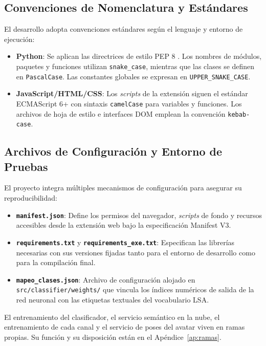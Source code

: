 \subsection{Convenciones de Nomenclatura y Estándares}

El desarrollo adopta convenciones estándares según el lenguaje y entorno de ejecución:

\begin{itemize}
    \item \textbf{Python}: Se aplican las directrices de estilo PEP 8 \cite{vanrossum2001pep8}. Los nombres de módulos, paquetes y funciones utilizan \texttt{snake\_case}, mientras que las clases se definen en \texttt{PascalCase}. Las constantes globales se expresan en \texttt{UPPER\_SNAKE\_CASE}.
    \item \textbf{JavaScript/HTML/CSS}: Los \textit{scripts} de la extensión siguen el estándar ECMAScript 6+ \cite{ecma2015ecmascript} con sintaxis \texttt{camelCase} para variables y funciones. Los archivos de hoja de estilo e interfaces DOM emplean la convención \texttt{kebab-case}.
\end{itemize}

\subsection{Archivos de Configuración y Entorno de Pruebas}

El proyecto integra múltiples mecanismos de configuración para asegurar su reproducibilidad:

\begin{itemize}
    \item \textbf{\texttt{manifest.json}}: Define los permisos del navegador, \textit{scripts} de fondo y recursos accesibles desde la extensión web bajo la especificación Manifest V3.
    \item \textbf{\texttt{requirements.txt}} y \textbf{\texttt{requirements\_exe.txt}}: Especifican las librerías necesarias con sus versiones fijadas tanto para el entorno de desarrollo como para la compilación final.
    \item \textbf{\texttt{mapeo\_clases.json}}: Archivo de configuración alojado en \texttt{src/\allowbreak classifier/\allowbreak weights/} que vincula los índices numéricos de salida de la red neuronal con las etiquetas textuales del vocabulario LSA.
\end{itemize}

El entrenamiento del clasificador, el servicio semántico en la nube, el entrenamiento de cada canal y el servicio de poses del avatar viven en ramas propias. Su función y su disposición están en el Apéndice~\ref{ap:ramas}.

